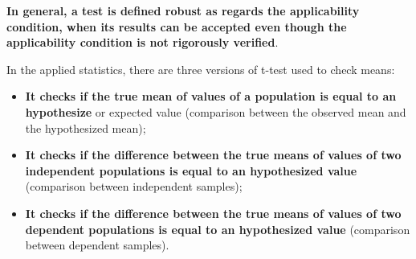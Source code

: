 \begin{frame}
  \vspace*{2.5cm}
  \textbf{In general, a test is defined robust as regards the applicability condition, when its results can be accepted even though the applicability condition is not rigorously verified}.
\end{frame}

\begin{frame}
  \vspace*{.5cm}
  In the applied statistics, there are three versions of t-test used to check means:\\
  \vspace*{.25cm}
  \begin{itemize}
    \item \textbf{It checks if the true mean of values of a population is equal to an hypothesize} or expected value (comparison between the observed mean and the hypothesized mean);
    \vspace*{.5cm}
    \item \textbf{It checks if the difference between the true means of values of two independent populations is equal to an hypothesized value} (comparison between independent samples);
    \vspace*{.5cm}
    \item\textbf{It checks if the difference between the true means of values of two dependent populations is equal to an hypothesized value} (comparison between dependent samples).
  \end{itemize}
\end{frame}


